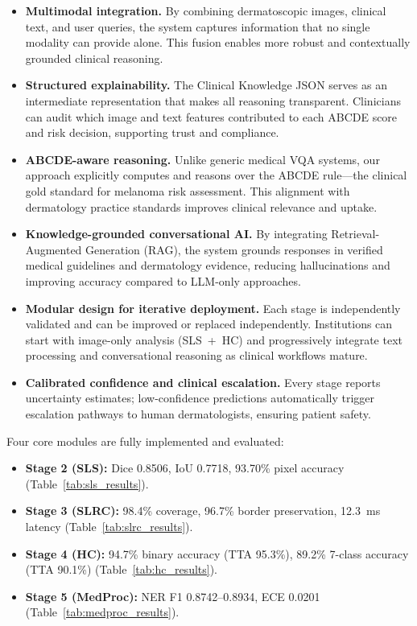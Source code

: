 \documentclass[conference]{IEEEtran}
\begin{document}
\begin{itemize}[leftmargin=*]
    \item \textbf{Multimodal integration.} By combining dermatoscopic images,
          clinical text, and user queries, the system captures information that
          no single modality can provide alone. This fusion enables more robust
          and contextually grounded clinical reasoning.
    \item \textbf{Structured explainability.} The Clinical Knowledge JSON serves
          as an intermediate representation that makes all reasoning transparent.
          Clinicians can audit which image and text features contributed to each
          ABCDE score and risk decision, supporting trust and compliance.
    \item \textbf{ABCDE-aware reasoning.} Unlike generic medical VQA systems, our
          approach explicitly computes and reasons over the ABCDE rule---the
          clinical gold standard for melanoma risk assessment. This alignment with
          dermatology practice standards improves clinical relevance and uptake.
    \item \textbf{Knowledge-grounded conversational AI.} By integrating Retrieval-Augmented
          Generation (RAG), the system grounds responses in verified medical guidelines
          and dermatology evidence, reducing hallucinations and improving accuracy
          compared to LLM-only approaches.
    \item \textbf{Modular design for iterative deployment.} Each stage is independently
          validated and can be improved or replaced independently. Institutions can
          start with image-only analysis (SLS~+~HC) and progressively integrate text
          processing and conversational reasoning as clinical workflows mature.
    \item \textbf{Calibrated confidence and clinical escalation.} Every stage reports
          uncertainty estimates; low-confidence predictions automatically trigger
          escalation pathways to human dermatologists, ensuring patient safety.
\end{itemize}

Four core modules are fully implemented and evaluated:
\begin{itemize}[leftmargin=*]
    \item \textbf{Stage 2 (SLS):} Dice 0.8506, IoU 0.7718, 93.70\%
          pixel accuracy (Table~\ref{tab:sls_results}).
    \item \textbf{Stage 3 (SLRC):} 98.4\% coverage, 96.7\% border
          preservation, 12.3~ms latency (Table~\ref{tab:slrc_results}).
    \item \textbf{Stage 4 (HC):} 94.7\% binary accuracy (TTA 95.3\%),
          89.2\% 7-class accuracy (TTA 90.1\%)
          (Table~\ref{tab:hc_results}).
    \item \textbf{Stage 5 (MedProc):} NER F1 0.8742--0.8934, ECE
          0.0201 (Table~\ref{tab:medproc_results}).
\end{itemize}
\end{document}

